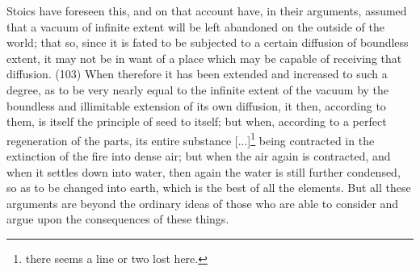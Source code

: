Stoics have foreseen this, and on that account have, in their arguments, assumed that a vacuum
of infinite extent will be left abandoned on the outside of the world; that so, since it is fated to be
subjected to a certain diffusion of boundless extent, it may not be in want of a place which may be
capable of receiving that diffusion. (103) When therefore it has been extended and increased to
such a degree, as to be very nearly equal to the infinite extent of the vacuum by the boundless and
illimitable extension of its own diffusion, it then, according to them, is itself the principle of seed to
itself; but when, according to a perfect regeneration of the parts, its entire substance [...]\footnote{there
seems a line or two lost here.} being contracted in the extinction of the fire into dense air; but when the
air again is contracted, and when it settles down into water, then again the water is still further
condensed, so as to be changed into earth, which is the best of all the elements. But all these
arguments are beyond the ordinary ideas of those who are able to consider and argue upon the
consequences of these things.

